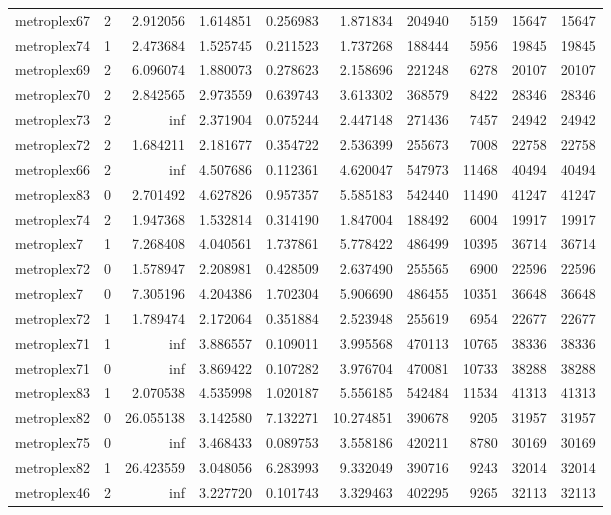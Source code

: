 \begin{longtable}{|l|r|r|r|r|r|r|r|r|r|}
metroplex67 & 2 & 2.912056 & 1.614851 & 0.256983 & 1.871834 & 204940 & 5159 & 15647 & 15647 \\
metroplex74 & 1 & 2.473684 & 1.525745 & 0.211523 & 1.737268 & 188444 & 5956 & 19845 & 19845 \\
metroplex69 & 2 & 6.096074 & 1.880073 & 0.278623 & 2.158696 & 221248 & 6278 & 20107 & 20107 \\
metroplex70 & 2 & 2.842565 & 2.973559 & 0.639743 & 3.613302 & 368579 & 8422 & 28346 & 28346 \\
metroplex73 & 2 & inf & 2.371904 & 0.075244 & 2.447148 & 271436 & 7457 & 24942 & 24942 \\
metroplex72 & 2 & 1.684211 & 2.181677 & 0.354722 & 2.536399 & 255673 & 7008 & 22758 & 22758 \\
metroplex66 & 2 & inf & 4.507686 & 0.112361 & 4.620047 & 547973 & 11468 & 40494 & 40494 \\
metroplex83 & 0 & 2.701492 & 4.627826 & 0.957357 & 5.585183 & 542440 & 11490 & 41247 & 41247 \\
metroplex74 & 2 & 1.947368 & 1.532814 & 0.314190 & 1.847004 & 188492 & 6004 & 19917 & 19917 \\
metroplex7 & 1 & 7.268408 & 4.040561 & 1.737861 & 5.778422 & 486499 & 10395 & 36714 & 36714 \\
metroplex72 & 0 & 1.578947 & 2.208981 & 0.428509 & 2.637490 & 255565 & 6900 & 22596 & 22596 \\
metroplex7 & 0 & 7.305196 & 4.204386 & 1.702304 & 5.906690 & 486455 & 10351 & 36648 & 36648 \\
metroplex72 & 1 & 1.789474 & 2.172064 & 0.351884 & 2.523948 & 255619 & 6954 & 22677 & 22677 \\
metroplex71 & 1 & inf & 3.886557 & 0.109011 & 3.995568 & 470113 & 10765 & 38336 & 38336 \\
metroplex71 & 0 & inf & 3.869422 & 0.107282 & 3.976704 & 470081 & 10733 & 38288 & 38288 \\
metroplex83 & 1 & 2.070538 & 4.535998 & 1.020187 & 5.556185 & 542484 & 11534 & 41313 & 41313 \\
metroplex82 & 0 & 26.055138 & 3.142580 & 7.132271 & 10.274851 & 390678 & 9205 & 31957 & 31957 \\
metroplex75 & 0 & inf & 3.468433 & 0.089753 & 3.558186 & 420211 & 8780 & 30169 & 30169 \\
metroplex82 & 1 & 26.423559 & 3.048056 & 6.283993 & 9.332049 & 390716 & 9243 & 32014 & 32014 \\
metroplex46 & 2 & inf & 3.227720 & 0.101743 & 3.329463 & 402295 & 9265 & 32113 & 32113 \\

\end{longtable}
